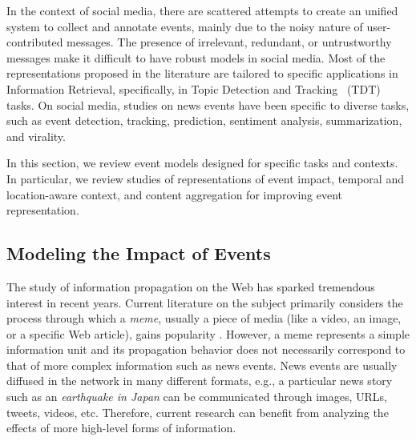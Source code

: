 In the context of social media, there are scattered attempts to create an
unified system to collect and annotate events, mainly due to the noisy nature of
user-contributed messages.
%
The presence of irrelevant, redundant, or untrustworthy messages make it
difficult to have robust models in social media.
%
Most of the representations proposed in the literature are tailored to specific
applications in Information Retrieval, specifically, in Topic Detection and
Tracking~\cite{allan2012topic} (TDT) tasks.
%
On social media, studies on news events have been specific to diverse tasks,
such as event detection, tracking, prediction, sentiment analysis,
summarization, and virality. 
%

In this section, we review event models designed for specific tasks and
contexts. 
%
In particular, we review studies of representations of event impact, temporal
and location-aware context, and content aggregation for improving event
representation.


\subsection{Modeling the Impact of Events}

The study of information propagation on the Web has sparked tremendous interest
in recent years. 
%
Current literature on the subject primarily considers the process through which
a {\em meme}, usually a piece of media (like a video, an image, or a specific
Web article), gains popularity
\cite{Castillo:2014,Szabo:2010,Lerman:2010,Tatar2014,Pinto:2013,Ahmed:2013,Li:2016:concept:drift,
Liu:2015:UN}. 
%
However, a meme represents a simple information unit and its propagation
behavior does not necessarily correspond to that of more complex information
such as news events. 
%
News events are usually diffused in the network in many different formats, e.g.,
a particular news story such as an {\em earthquake in Japan} can be communicated
through images, URLs, tweets, videos, etc. 
%
Therefore, current research can benefit from analyzing the effects of more
high-level forms of information. 

